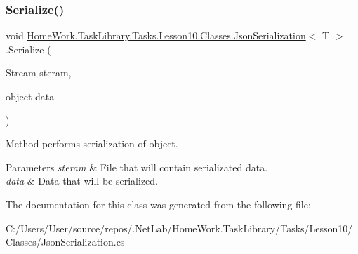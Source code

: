 \subsubsection{\texorpdfstring{Serialize()}{Serialize()}}
{\footnotesize\ttfamily void \mbox{\hyperlink{class_home_work_1_1_task_library_1_1_tasks_1_1_lesson10_1_1_classes_1_1_json_serialization}{Home\+Work.\+Task\+Library.\+Tasks.\+Lesson10.\+Classes.\+Json\+Serialization}}$<$ T $>$.Serialize (\begin{DoxyParamCaption}\item[{Stream}]{steram,  }\item[{object}]{data }\end{DoxyParamCaption})}



Method performs serialization of object. 


\begin{DoxyParams}{Parameters}
{\em steram} & File that will contain serializated data.\\
\hline
{\em data} & Data that will be serialized.\\
\hline
\end{DoxyParams}


The documentation for this class was generated from the following file\+:\begin{DoxyCompactItemize}
\item 
C\+:/\+Users/\+User/source/repos/.\+Net\+Lab/\+Home\+Work.\+Task\+Library/\+Tasks/\+Lesson10/\+Classes/Json\+Serialization.\+cs\end{DoxyCompactItemize}
